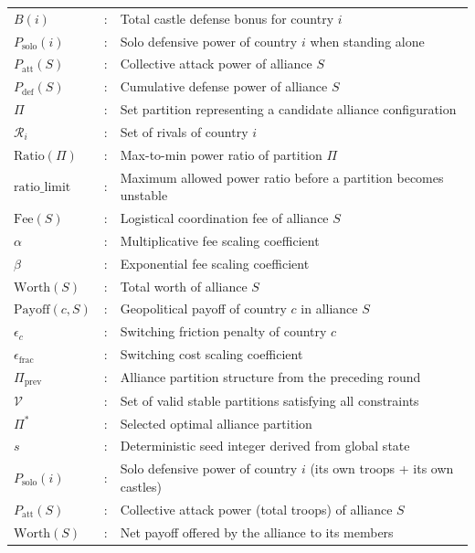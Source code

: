 \begin{tabular}{lcl}
    $B(i)$ &:& Total castle defense bonus for country $i$\\
    $P_{\text{solo}}(i)$ &:& Solo defensive power of country $i$ when standing alone\\
    $P_{\text{att}}(S)$ &:& Collective attack power of alliance $S$\\
    $P_{\text{def}}(S)$ &:& Cumulative defense power of alliance $S$\\
    $\Pi$ &:& Set partition representing a candidate alliance configuration\\
    $\mathcal{R}_i$ &:& Set of rivals of country $i$\\
    $\text{Ratio}(\Pi)$ &:& Max-to-min power ratio of partition $\Pi$\\
    $\text{ratio\_limit}$ &:& Maximum allowed power ratio before a partition becomes unstable\\
    $\text{Fee}(S)$ &:& Logistical coordination fee of alliance $S$\\
    $\alpha$ &:& Multiplicative fee scaling coefficient\\
    $\beta$ &:& Exponential fee scaling coefficient\\
    $\text{Worth}(S)$ &:& Total worth of alliance $S$\\
    $\text{Payoff}(c, S)$ &:& Geopolitical payoff of country $c$ in alliance $S$\\
    $\epsilon_c$ &:& Switching friction penalty of country $c$\\
    $\epsilon_{\text{frac}}$ &:& Switching cost scaling coefficient\\
    $\Pi_{\text{prev}}$ &:& Alliance partition structure from the preceding round\\
    $\mathcal{V}$ &:& Set of valid stable partitions satisfying all constraints\\
    $\Pi^*$ &:& Selected optimal alliance partition\\
    $s$ &:& Deterministic seed integer derived from global state\\

    $P_{\text{solo}}(i)$ &:& Solo defensive power of country $i$ (its own troops + its own castles)\\
    $P_{\text{att}}(S)$ &:& Collective attack power (total troops) of alliance $S$\\
    $\text{Worth}(S)$ &:& Net payoff offered by the alliance to its members\\

    
\end{tabular}

